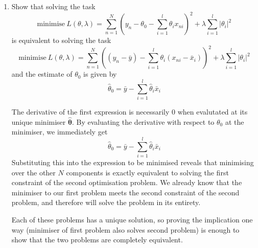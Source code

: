 \documentclass{article}
\newcommand{\chapternumber}{3}
\newenvironment{QandA}{\begin{enumerate}[label=\chapternumber.\arabic*]\bfseries\boldmath}
	{\end{enumerate}}
\newenvironment{answered}{\par\bigskip\normalfont\unboldmath}{}
\begin{document}
\begin{QandA}
		\item Show that solving the task 
		\[\text{minimise}\ L(\theta,\lambda)=\sum_{n=1}^N\left(y_n-\theta_0-\sum_{i=1}^l\theta_i x_{ni}\right)^2+\lambda\sum_{i=1}^l|\theta_i|^2\]
		is equivalent to solving the task
		\[\text{minimise}\ L(\theta,\lambda)=\sum_{n=1}^N\left((y_n-\bar{y})-\sum_{i=1}^l\theta_i (x_{ni}-\bar{x}_i)\right)^2+\lambda\sum_{i=1}^l|\theta_i|^2\]
		and the estimate of $\theta_0$ is given by
		\[\hat{\theta}_0=\bar{y}-\sum_{i=1}^l\hat{\theta}_i\bar{x}_i\]
		
		\begin{answered}
			The derivative of the first expression is necessarily 0 when evalutated at its unique minimiser ${\boldsymbol{\hat{\theta}}}$. By evaluating the derivative with respect to $\theta_0$ at the minimiser, we immediately get
			\[\hat{\theta}_0=\bar{y}-\sum_{i=1}^l\hat{\theta}_i\bar{x}_i\]
			Substituting this into the expression to be minimised reveals that minimising over the other $N$ components is exactly equivalent to solving the first constraint of the second optimisation problem. We already know that the minimiser to our first problem meets the second constraint of the second problem, and therefore will solve the problem in its entirety.
			
			Each of these problems has a unique solution, so proving the implication one way (minimiser of first problem also solves second problem) is enough to show that the two problems are completely equivalent.
		\end{answered}
	\end{QandA}
	
\end{document}
